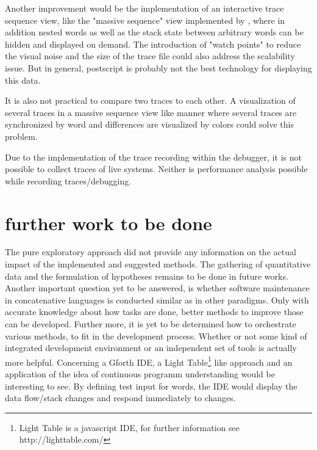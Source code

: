 Another improvement would be the implementation of an interactive trace sequence view, like the "massive sequence" view implemented by \cite{Cornelissen:2008:ETA:1454787.1454981}, where in addition nested words as well as the stack state between arbitrary words can be hidden and displayed on demand. The introduction of "watch points" to reduce the visual noise and the size of the trace file could also address the scalability issue. But in general, postscript is probably not the best technology for displaying this data.

It is also not practical to compare two traces to each other. A visualization of several traces in a massive sequence view like manner where several traces are synchronized by word and differences are visualized by colors could solve this problem.

Due to the implementation of the trace recording within the debugger, it is not possible to collect traces of live systems. Neither is performance analysis possible while recording traces/debugging.
 

\section{further work to be done}

The pure exploratory approach did not provide any information on the actual impact of the implemented and suggested methods. The gathering of quantitative data and the formulation of hypotheses remains to be done in future works.
Another important question yet to be answered, is whether software maintenance in concatenative languages is conducted similar as in other paradigms. Only with accurate knowledge about how tasks are done, better methods to improve those can be developed.
Further more, it is yet to be determined how to orchestrate various methods, to fit in the development process. Whether or not some kind of integrated development environment or an independent set of tools is actually more helpful.
Concerning a Gforth IDE, a Light Table\footnote{Light Table is a javascript IDE, for further information see http://lighttable.com/} like approach and an application of the idea of continuous programm understanding\cite{Muller:2000:RER:336512.336526} would be interesting to see. By defining test input for words, the IDE would display the data flow/stack changes and respond immediately to changes.

